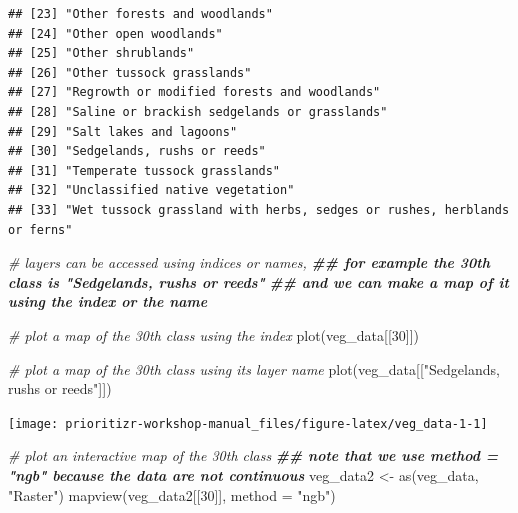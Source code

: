 \documentclass[
  12pt,
]{book}
\newenvironment{Shaded}{\begin{snugshade}}{\end{snugshade}}
\newcommand{\AttributeTok}[1]{\textcolor[rgb]{0.77,0.63,0.00}{#1}}
\newcommand{\CommentTok}[1]{\textcolor[rgb]{0.56,0.35,0.01}{\textit{#1}}}
\newcommand{\DecValTok}[1]{\textcolor[rgb]{0.00,0.00,0.81}{#1}}
\newcommand{\DocumentationTok}[1]{\textcolor[rgb]{0.56,0.35,0.01}{\textbf{\textit{#1}}}}
\newcommand{\FunctionTok}[1]{\textcolor[rgb]{0.00,0.00,0.00}{#1}}
\newcommand{\NormalTok}[1]{#1}
\newcommand{\OtherTok}[1]{\textcolor[rgb]{0.56,0.35,0.01}{#1}}
\newcommand{\StringTok}[1]{\textcolor[rgb]{0.31,0.60,0.02}{#1}}
\begin{document}
\begin{verbatim}
## [23] "Other forests and woodlands"                                                                               
## [24] "Other open woodlands"                                                                                      
## [25] "Other shrublands"                                                                                          
## [26] "Other tussock grasslands"                                                                                  
## [27] "Regrowth or modified forests and woodlands"                                                                
## [28] "Saline or brackish sedgelands or grasslands"                                                               
## [29] "Salt lakes and lagoons"                                                                                    
## [30] "Sedgelands, rushs or reeds"                                                                                
## [31] "Temperate tussock grasslands"                                                                              
## [32] "Unclassified native vegetation"                                                                            
## [33] "Wet tussock grassland with herbs, sedges or rushes, herblands or ferns"
\end{verbatim}

\begin{Shaded}
\begin{Highlighting}[]
\CommentTok{\# layers can be accessed using indices or names,}
\DocumentationTok{\#\# for example the 30th class is "Sedgelands, rushs or reeds"}
\DocumentationTok{\#\# and we can make a map of it using the index or the name}

\CommentTok{\# plot a map of the 30th class using the index}
\FunctionTok{plot}\NormalTok{(veg\_data[[}\DecValTok{30}\NormalTok{]])}

\CommentTok{\# plot a map of the 30th class using its layer name}
\FunctionTok{plot}\NormalTok{(veg\_data[[}\StringTok{"Sedgelands, rushs or reeds"}\NormalTok{]])}
\end{Highlighting}
\end{Shaded}

\begin{center}\texttt{[image: prioritizr-workshop-manual\_files/figure-latex/veg\_data-1-1]} \end{center}

\begin{Shaded}
\begin{Highlighting}[]
\CommentTok{\# plot an interactive map of the 30th class}
\DocumentationTok{\#\# note that we use method = "ngb" because the data are not continuous}
\NormalTok{veg\_data2 }\OtherTok{\textless{}{-}} \FunctionTok{as}\NormalTok{(veg\_data, }\StringTok{"Raster"}\NormalTok{)}
\FunctionTok{mapview}\NormalTok{(veg\_data2[[}\DecValTok{30}\NormalTok{]], }\AttributeTok{method =} \StringTok{"ngb"}\NormalTok{)}
\end{Highlighting}
\end{Shaded}
\end{document}
